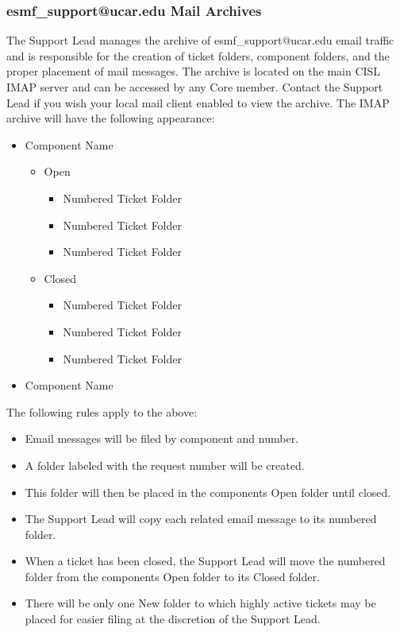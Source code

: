 \subsubsection{esmf\_support@ucar.edu Mail Archives}
The Support Lead manages the archive of esmf\_support@ucar.edu email traffic and is responsible for the creation of ticket folders, component folders, and the proper placement of mail messages. The archive is located on the main CISL IMAP server and can be accessed by any Core member.  Contact the Support Lead if you wish your local mail client enabled to view the archive.  The IMAP archive will have the following appearance:
\begin{itemize}
\item{Component Name}
  \begin{itemize}
    \item{Open}
      \begin{itemize}
        \item{Numbered Ticket Folder}
        \item{Numbered Ticket Folder}
        \item{Numbered Ticket Folder}
      \end{itemize}
    \item{Closed}
      \begin{itemize}
        \item{Numbered Ticket Folder}
        \item{Numbered Ticket Folder}
        \item{Numbered Ticket Folder}
      \end{itemize}
    \end{itemize}
\item{Component Name}
\end{itemize}

The following rules apply to the above:

\begin{itemize}
\item Email messages will be filed by component and number. 
\item A folder labeled with the request number will be created. 
\item This folder will then be placed in the components Open folder until closed.  
\item The Support Lead will copy each related email message to its numbered folder. 
\item When a ticket has been closed, the Support Lead will move the numbered folder from the components Open folder to its Closed folder.
\item There will be only one New folder to which highly active tickets may be placed 
for easier filing at the discretion of the Support Lead. 
\end{itemize}

